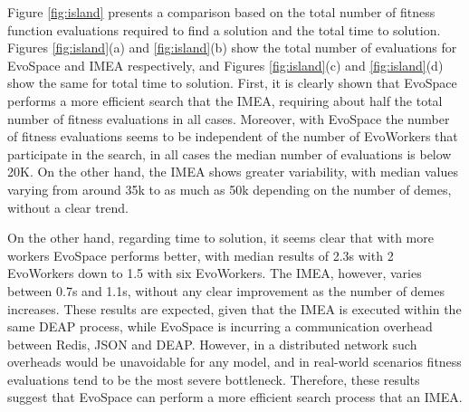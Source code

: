 Figure \ref{fig:island} presents a comparison based on the total number of fitness function evaluations required to find a solution
and the total time to solution.
Figures \ref{fig:island}(a) and \ref{fig:island}(b) show the total number of evaluations for EvoSpace and IMEA respectively,
and Figures \ref{fig:island}(c) and \ref{fig:island}(d)  show the same for total time to solution.
First, it is clearly shown that EvoSpace performs a more efficient search that the IMEA, requiring about half the total number of fitness evaluations 
in all cases. Moreover, with EvoSpace the number of fitness evaluations seems to be independent of the number of EvoWorkers that participate in the search, in all cases the median number of evaluations is below 20K.
On the other hand, the IMEA shows greater variability, with median values varying from around 35k to as much as 50k depending on the number of
demes, without a clear trend.

On the other hand, regarding time to solution, it seems clear that with more workers EvoSpace performs better, with median results of 2.3s with 2 EvoWorkers down to 1.5 with six EvoWorkers.
The IMEA, however, varies between 0.7s and 1.1s, without any clear improvement as the number of demes increases.
These results are expected, given that the IMEA is executed within the same DEAP process, while EvoSpace is incurring a communication overhead between Redis, JSON and DEAP.
However, in a distributed network such overheads would be unavoidable for any model, and in real-world scenarios fitness evaluations tend to be the most severe bottleneck.
Therefore, these results suggest that EvoSpace can perform a more efficient search process that an IMEA.


